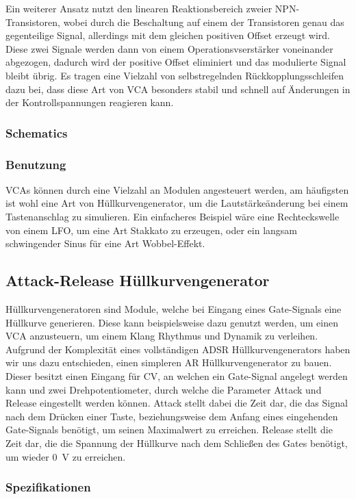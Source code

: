 Ein weiterer Ansatz nutzt den linearen Reaktionsbereich zweier NPN-Transistoren, wobei durch die Beschaltung auf einem der Transistoren genau das gegenteilige Signal, allerdings mit dem gleichen positiven Offset erzeugt wird. Diese zwei Signale werden dann von einem Operationsvserstärker voneinander abgezogen, dadurch wird der positive Offset eliminiert und das modulierte Signal bleibt übrig. Es tragen eine Vielzahl von selbstregelnden Rückkopplungsschleifen dazu bei, dass diese Art von \ac{VCA} besonders stabil und schnell auf Änderungen in der Kontrollspannungen reagieren kann.
\subsubsection{Schematics}
\label{sec:org336516c}
\subsubsection{Benutzung}
\label{sec:org03a4a10}
\acp{VCA} können durch eine Vielzahl an Modulen angesteuert werden, am häufigsten ist wohl eine Art von Hüllkurvengenerator, um die Lautstärkeänderung bei einem Tastenanschlag zu simulieren. Ein einfacheres Beispiel wäre eine Rechteckswelle von einem LFO, um eine Art Stakkato zu erzeugen, oder ein langsam schwingender Sinus für eine Art Wobbel-Effekt.

\subsection{Attack-Release Hüllkurvengenerator}
\label{sec:org61cd6dd}
Hüllkurvengeneratoren sind Module, welche bei Eingang eines Gate-Signals eine Hüllkurve generieren. Diese kann beispielsweise dazu genutzt werden, um einen \ac{VCA} anzusteuern, um einem Klang Rhythmus und Dynamik zu verleihen. Aufgrund der Komplexität eines vollständigen \ac{ADSR} Hüllkurvengenerators haben wir uns dazu entschieden, einen simpleren \ac{AR} Hüllkurvengenerator zu bauen. Dieser besitzt einen Eingang für \acl{CV}, an welchen ein Gate-Signal angelegt werden kann und zwei Drehpotentiometer, durch welche die Parameter Attack und Release eingestellt werden können. Attack stellt dabei die Zeit dar, die das Signal nach dem Drücken einer Taste, beziehungsweise dem Anfang eines eingehenden Gate-Signals benötigt, um seinen Maximalwert zu erreichen. Release stellt die Zeit dar, die die Spannung der Hüllkurve nach dem Schließen des Gates benötigt, um wieder \SI{0}{\volt} zu erreichen.

\subsubsection{Spezifikationen}
\label{sec:org64febf8}
